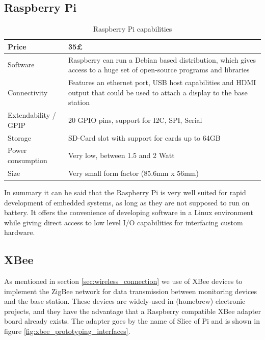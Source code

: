\subsection{Raspberry Pi}
\begin{table}
\centering
\begin{tabular}{|l|m{6cm}|}
\hline
	Price &
	35£   \\ 
\hline
  	Software &
  	Raspberry can run a Debian based distribution, which gives access to a huge set of open-source programs and libraries  \\ 
\hline
	Connectivity &
	Features an ethernet port, USB host capabilities and HDMI output that could be used to attach a display to the base station  \\ 
\hline
	Extendability / GPIP  &
	20 GPIO pins, support for I2C, SPI, Serial  \\ 
\hline
	Storage &
	SD-Card slot with support for cards up to 64GB  \\ 
\hline
	Power consumption &
	Very low, between 1.5 and 2 Watt \\ 
\hline
 	Size &
 	Very small form factor (85.6mm x 56mm)  \\ 
\hline 
\end{tabular} 
\caption{Raspberry Pi capabilities}
\label{tab:raspberry_capabilities}
\end{table}

In summary it can be said that the Raspberry Pi is very well suited for rapid development of embedded systems, as long as they are not supposed to run on battery. It offers the convenience of developing software in a Linux environment while giving direct access to low level I/O capabilities for interfacing custom hardware.

\subsection{XBee}
As mentioned in section \ref{sec:wireless_connection} we use of XBee devices to implement the ZigBee network for data transmission between monitoring devices and the base station. These devices are widely-used in (homebrew) electronic projects, and they have the advantage that a Raspberry compatible XBee adapter board already exists. The adapter goes by the name of Slice of Pi and is shown in figure \ref{fig:xbee_prototyping_interfaces}.
